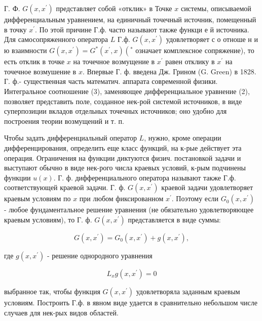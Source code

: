 \documentclass[10pt]{article}
\begin{document}
Г. Ф. $G\left(x, x^{\prime}\right)$ представляет собой «отклик» в Точке $x$ системы, описываемой дифференциальным уравнением, на единичный точечный источник, помещенный в точку $x^{\prime}$. По этой причине Г.ф. часто называют также функци е й источника. Для самосопряженного оператора $L$ Г.ф. $G\left(x, x^{\prime}\right)$ удовлетворяет с о отноше н и ю взаимности $G\left(x, x^{\prime}\right)=G^{*}\left(x^{\prime}, x\right)\left({ }^{*}\right.$ означает комплексное сопряжение), то есть отклик в точке $x$ на точечное возмущение в $x^{\prime}$ равен отклику в $x^{\prime}$ на точечное возмушение в $x$. Впервые Г. ф. введена Дж. Грином (G. Green) в 1828. Г. ф.- существенная часть математич. аппарата современной физики. Интегральное соотношение (3), заменяющее дифференциальное уравнение (2), позволяет представить поле, созданное нек-рой системой источников, в виде суперпозиции вкладов отдельных точечных источников; оно удобно для построения теории возмущений и т. п.



Чтобы задать дифференциальный оператор $L$, нужно, кроме операции дифференцирования, определить еще класс функций, на к-рые действует эта операция. Ограничения на функции диктуются физич. постановкой задачи и выступают обычно в виде нек-рого числа краевых условий, к-рым подчинены функции $u(x)$. Г. ф. дифференциального оператора называют также Г.ф. соответствующей краевой задачи. Г. ф. $G\left(x, x^{\prime}\right)$ краевой задачи удовлетворяет краевым условиям по $x$ при любом фиксированном $x^{\prime}$. Поэтому если $G_{0}\left(x, x^{\prime}\right)$ - любое фундаментальное решение уравнения (не обязательно удовлетворяющее краевым условиям), то Г. ф. $G\left(x, x^{\prime}\right)$ представляется в виде суммы:



\[

G\left(x, x^{\prime}\right)=G_{0}\left(x, x^{\prime}\right)+g\left(x, x^{\prime}\right),

\]



где $g\left(x, x^{\prime}\right)$ - решение однородного уравнения



\[

L_{x} g\left(x, x^{\prime}\right)=0

\]



выбранное так, чтобы функция $G\left(x, x^{\prime}\right)$ удовлетворяла заданным краевым условиям. Построить Г.ф. в явном виде удается в сравнительно небольшом числе случаев для нек-рых видов областей.
\end{document}

